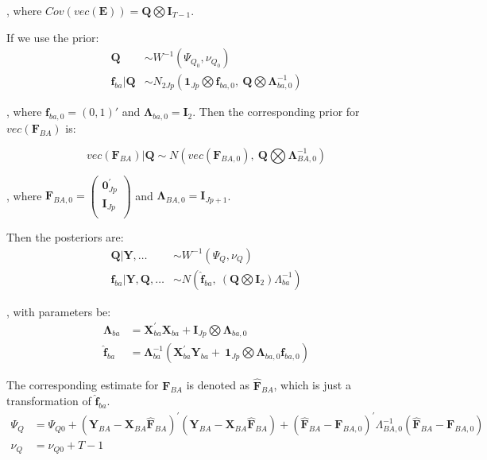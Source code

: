 \documentclass[]{article}
\begin{document}
, where
\(Cov\left(vec(\mathbf{E}) \right) = \mathbf{Q}\bigotimes \mathbf{I}_{T - 1}\).

If we use the prior:
\begin{align*}
	\mathbf{Q} &\sim W^{- 1}(\Psi_{Q_{0}},\nu_{Q_{0}})\\
	\mathbf{f}_{ba}|\mathbf{Q} &\sim N_{2Jp}(\mathbf{1}_{Jp}\bigotimes \mathbf{f}_{ba,0},\ \mathbf{Q}\bigotimes\bm{\Lambda}_{ba,0}^{- 1})
\end{align*}

, where \(\mathbf{f}_{ba,0} = (0, 1)'\) and \(\bm{\Lambda}_{ba,0} = \mathbf{I}_{2}\). Then the
corresponding prior for \(vec(\mathbf{F}_{BA})\) is:

\[vec\left( \mathbf{F}_{BA} \right)|\mathbf{Q} \sim N(vec\left( \mathbf{F}_{BA,0} \right),\ \mathbf{Q}\bigotimes\bm{\Lambda}_{BA,0}^{- 1})\]

, where \(\mathbf{F}_{BA,0} = \begin{pmatrix}
	\mathbf{0}_{Jp}^{'} \\
	\mathbf{I}_{Jp} \\
\end{pmatrix}\) and \(\bm{\Lambda}_{BA,0} = \mathbf{I}_{Jp + 1}\).

Then the posteriors are:
\begin{align*}
	\mathbf{Q}|\mathbf{Y},\ldots &\sim W^{- 1}(\Psi_{Q},\nu_{Q})\\
	\mathbf{f}_{ba}|\mathbf{Y},\mathbf{Q},\ldots &\sim N({\widehat{\mathbf{f}}}_{ba},\ (\mathbf{Q}\bigotimes \mathbf{I}_{2})\Lambda_{ba}^{- 1})
\end{align*}

, with parameters be:
\begin{align*}
	\bm{\Lambda}_{ba} &= \mathbf{X}_{ba}^{'}\mathbf{X}_{ba} + \mathbf{I}_{Jp}\bigotimes\bm{\Lambda}_{ba,0}\\
	{\widehat{\mathbf{f}}}_{ba} &= \bm{\Lambda}_{ba}^{- 1}\left( \mathbf{X}_{ba}^{'}\mathbf{Y}_{ba} + \ \mathbf{1}_{Jp}\bigotimes\bm{\Lambda}_{ba,0}\mathbf{f}_{ba,0} \right)
\end{align*}

The corresponding estimate for \(\mathbf{F}_{BA}\) is denoted as
\({\widehat{\mathbf{F}}}_{BA}\), which is just a transformation of \({\widehat{\mathbf{f}}}_{ba}\).
\begin{align*}
	\Psi_{Q} &= \Psi_{Q0} + \left( \mathbf{Y}_{BA} - \mathbf{X}_{BA}{\widehat{\mathbf{F}}}_{BA} \right)^{'}\left( \mathbf{Y}_{BA} - \mathbf{X}_{BA}{\widehat{\mathbf{F}}}_{BA} \right) + \left( {\widehat{\mathbf{F}}}_{BA} - \mathbf{F}_{BA,0} \right)^{'}\Lambda_{BA,0}^{- 1}\left( {\widehat{\mathbf{F}}}_{BA} - \mathbf{F}_{BA,0} \right)\\
	\nu_{Q} &= \nu_{Q0} + T - 1
\end{align*}
\end{document}
